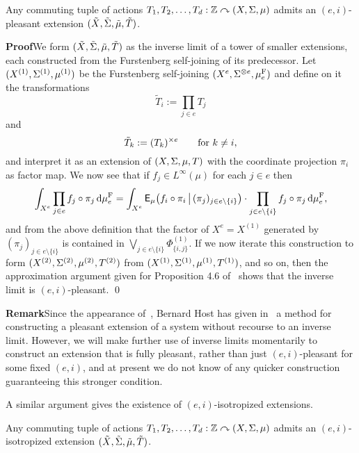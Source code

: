 \documentclass[12pt]{article}
\begin{document}
\begin{lem}\label{lem:partpleasant} Any commuting tuple of actions
$T_1,T_2,\ldots,T_d:\bbZ\curvearrowright (X,\S,\mu)$ admits an
$(e,i)$-pleasant extension
$(\tilde{X},\tilde{\S},\tilde{\mu},\tilde{T})$.
\end{lem}

\textbf{Proof}\quad We form
$(\tilde{X},\tilde{\S},\tilde{\mu},\tilde{T})$ as the inverse limit
of a tower of smaller extensions, each constructed from the
Furstenberg self-joining of its predecessor.  Let
$(X^{(1)},\S^{(1)},\mu^{(1)})$ be the Furstenberg self-joining
$(X^e,\S^{\otimes e},\mu^{\rm{F}}_e)$ and define on it the
transformations
\[\tilde{T}_i:=\prod_{j \in e}T_j\]
and
\[\tilde{T}_k:=(T_k)^{\times e}\quad\quad\hbox{for}\ k \neq i,\]
and interpret it as an extension of $(X,\S,\mu,T)$ with the
coordinate projection $\pi_i$ as factor map. We now see that if $f_j
\in L^\infty(\mu)$ for each $j \in e$ then
\[\int_{X^e}\prod_{j\in e}f_j\circ\pi_j\,\d\mu^{\rm{F}}_e = \int_{X^e}\sfE_\mu\big(f_i\circ\pi_i\,\big|\,(\pi_j)_{j\in e\setminus\{i\}}\big)\cdot\prod_{j\in
e\setminus\{i\}}f_j\circ\pi_j\,\d\mu^{\rm{F}}_e,\] and from the
above definition that the factor of $X^e = X^{(1)}$ generated by
$(\pi_j)_{j\in e\setminus\{i\}}$ is contained in $\bigvee_{j\in
e\setminus \{i\}}\Phi^{(1)}_{\{i,j\}}$. If we now iterate this
construction to form $(X^{(2)},\S^{(2)},\mu^{(2)},T^{(2)})$ from
$(X^{(1)},\S^{(1)},\mu^{(1)},T^{(1)})$, and so on, then the
approximation argument given for Proposition 4.6
of~\cite{Aus--nonconv} shows that the inverse limit is
$(e,i)$-pleasant. \qed

\textbf{Remark}\quad Since the appearance of~\cite{Aus--nonconv},
Bernard Host has given in~\cite{Hos??} a method for constructing a
pleasant extension of a system without recourse to an inverse limit.
However, we will make further use of inverse limits momentarily to
construct an extension that is fully pleasant, rather than just
$(e,i)$-pleasant for some fixed $(e,i)$, and at present we do not
know of any quicker construction guaranteeing this stronger
condition. \fin

A similar argument gives the existence of $(e,i)$-isotropized
extensions.

\begin{lem}\label{lem:isotropized} Any commuting tuple of actions
$T_1,T_2,\ldots,T_d:\bbZ\curvearrowright (X,\S,\mu)$ admits an
$(e,i)$-isotropized extension
$(\tilde{X},\tilde{\S},\tilde{\mu},\tilde{T})$.
\end{lem}
\end{document}
